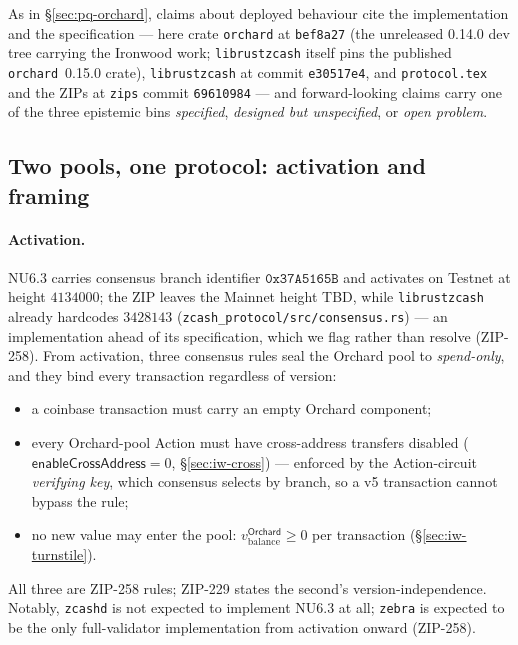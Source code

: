 \documentclass[11pt,a4paper]{article}
\theoremstyle{definition}
\begin{document}
As in \S\ref{sec:pq-orchard}, claims about deployed behaviour cite the
implementation and the specification --- here crate \texttt{orchard} at
\texttt{bef8a27} (the unreleased 0.14.0 dev tree carrying the Ironwood work;
\texttt{librustzcash} itself pins the published \texttt{orchard}~0.15.0 crate),
\texttt{librustzcash} at
commit \texttt{e30517e4}, and \texttt{protocol.tex} and the ZIPs at
\texttt{zips} commit \texttt{69610984} --- and forward-looking claims carry
one of the three epistemic bins \emph{specified}, \emph{designed but
unspecified}, or \emph{open problem}.

\subsection{Two pools, one protocol: activation and framing}\label{sec:iw-pools}

\paragraph{Activation.} NU6.3 carries consensus branch identifier
$\mathtt{0x37A5165B}$ and activates on Testnet at height $4134000$; the ZIP
leaves the Mainnet height TBD, while \texttt{librustzcash} already hardcodes
$3428143$ (\texttt{zcash\_protocol/src/consensus.rs}) --- an
implementation ahead of its specification, which we flag rather than resolve
(ZIP-258).
From activation, three consensus rules seal the Orchard pool to
\emph{spend-only}, and they bind every transaction regardless of version:
\begin{itemize}[leftmargin=*]
\item a coinbase transaction must carry an empty Orchard component;
\item every Orchard-pool Action must have cross-address transfers disabled
($\mathsf{enableCrossAddress} = 0$, \S\ref{sec:iw-cross}) --- enforced by the
Action-circuit \emph{verifying key}, which consensus selects by branch, so a
v5 transaction cannot bypass the rule;
\item no new value may enter the pool:
$v_{\mathrm{balance}}^{\mathsf{Orchard}} \ge 0$ per transaction
(\S\ref{sec:iw-turnstile}).
\end{itemize}
All three are ZIP-258 rules; ZIP-229 states the second's
version-independence. Notably, \texttt{zcashd} is not expected to implement
NU6.3 at all; \texttt{zebra} is expected to be the only full-validator
implementation from activation onward (ZIP-258).
\end{document}
